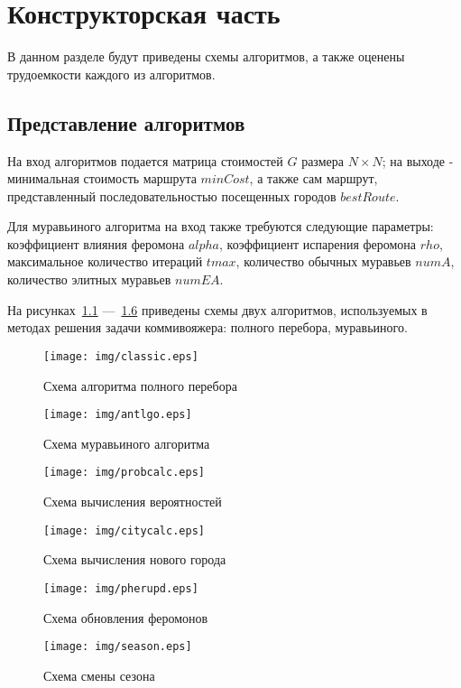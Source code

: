 \chapter{Конструкторская часть}
В данном разделе будут приведены схемы алгоритмов, а также оценены трудоемкости каждого из алгоритмов.

\section{Представление алгоритмов}

На вход алгоритмов подается матрица стоимостей $G$ размера $N \times N$; на выходе - минимальная стоимость маршрута $minCost$, а также сам маршрут, представленный последовательностью посещенных городов $bestRoute$.

Для муравьиного алгоритма на вход также требуются следующие параметры: коэффициент влияния феромона $alpha$, коэффициент испарения феромона $rho$, максимальное количество итераций $tmax$, количество обычных муравьев $numA$, количество элитных муравьев $numEA$.

На рисунках~\ref{fig:classic} ---~\ref{fig:season} приведены схемы двух алгоритмов, используемых в методах решения задачи коммивояжера: полного перебора, муравьиного.

\clearpage

\begin{figure}[h]
	\centering
	\texttt{[image: img/classic.eps]}
	\caption{Схема алгоритма полного перебора}
	\label{fig:classic}
\end{figure}

\clearpage

\begin{figure}[h]
	\centering
	\texttt{[image: img/antlgo.eps]}
    \caption{Схема муравьиного алгоритма}
	\label{fig:antlgo}
\end{figure}
\begin{figure}[h]
	\centering
    \texttt{[image: img/probcalc.eps]}
	\caption{Схема вычисления вероятностей}
	\label{fig:vinograd}
\end{figure}
\begin{figure}[h]
	\centering
    \texttt{[image: img/citycalc.eps]}
	\caption{Схема вычисления нового города}
	\label{fig:vinograd}
\end{figure}
\begin{figure}[h]
	\centering
    \texttt{[image: img/pherupd.eps]}
	\caption{Схема обновления феромонов}
	\label{fig:vinograd}
\end{figure}
\begin{figure}[h]
	\centering
	\texttt{[image: img/season.eps]}
	\caption{Схема смены сезона}
	\label{fig:season}
\end{figure}

